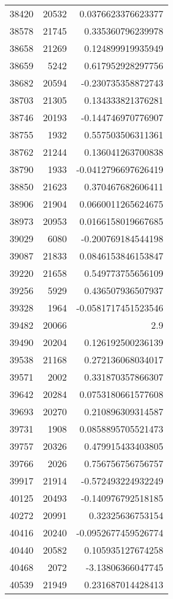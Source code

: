 \begin{tabular}{r | r | r}
38420 & 20532 & 0.0376623376623377 \\
38578 & 21745 & 0.335360796239978 \\
38658 & 21269 & 0.124899919935949 \\
38659 & 5242 & 0.617952928297756 \\
38682 & 20594 & -0.230735358872743 \\
38703 & 21305 & 0.134333821376281 \\
38746 & 20193 & -0.144746970776907 \\
38755 & 1932 & 0.557503506311361 \\
38762 & 21244 & 0.136041263700838 \\
38790 & 1933 & -0.0412796697626419 \\
38850 & 21623 & 0.370467682606411 \\
38906 & 21904 & 0.0660011265624675 \\
38973 & 20953 & 0.0166158019667685 \\
39029 & 6080 & -0.200769184544198 \\
39087 & 21833 & 0.0846153846153847 \\
39220 & 21658 & 0.549773755656109 \\
39256 & 5929 & 0.436507936507937 \\
39328 & 1964 & -0.0581717451523546 \\
39482 & 20066 & 2.9 \\
39490 & 20204 & 0.126192500236139 \\
39538 & 21168 & 0.272136068034017 \\
39571 & 2002 & 0.331870357866307 \\
39642 & 20284 & 0.0753180661577608 \\
39693 & 20270 & 0.210896309314587 \\
39731 & 1908 & 0.0858895705521473 \\
39757 & 20326 & 0.479915433403805 \\
39766 & 2026 & 0.756756756756757 \\
39917 & 21914 & -0.572493224932249 \\
40125 & 20493 & -0.140976792518185 \\
40272 & 20991 & 0.32325636753154 \\
40416 & 20240 & -0.0952677459526774 \\
40440 & 20582 & 0.105935127674258 \\
40468 & 2072 & -3.13806366047745 \\
40539 & 21949 & 0.231687014428413 \\

\end{tabular}
